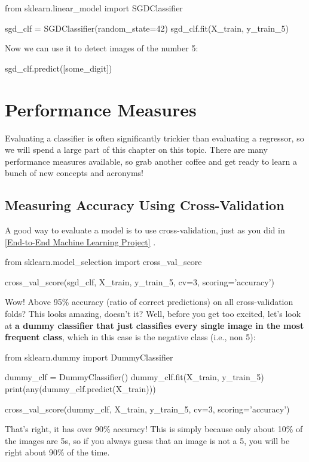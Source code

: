 \begin{pyc}
    from sklearn.linear_model import SGDClassifier

    sgd_clf = SGDClassifier(random_state=42)
    sgd_clf.fit(X_train, y_train_5)
\end{pyc}
Now we can use it to detect images of the number 5:
\begin{pyc}
    sgd_clf.predict([some_digit])
\end{pyc}
\section{Performance Measures}
Evaluating a classifier is often significantly trickier than evaluating a regressor, so we will spend a large part of this chapter on this topic. There are many performance measures available, so grab another coffee and get ready to learn a bunch of new concepts and acronyms!
\subsection{Measuring Accuracy Using Cross-Validation}
A good way to evaluate a model is to use cross-validation, just as you did in \autoref{End-to-End Machine Learning Project} .
\begin{pyc}
    from sklearn.model_selection import cross_val_score

    cross_val_score(sgd_clf, X_train, y_train_5, cv=3, scoring='accuracy')
\end{pyc}

Wow! Above 95\% accuracy (ratio of correct predictions) on all cross-validation folds? This looks amazing, doesn't it? Well, before you get too excited, let's look at \textbf{a dummy classifier that just classifies every single image in the most frequent class}, which in this case is the negative class (i.e., non 5):

\begin{pyc}
    from sklearn.dummy import DummyClassifier

    dummy_clf = DummyClassifier()
    dummy_clf.fit(X_train, y_train_5)
    print(any(dummy_clf.predict(X_train)))

    cross_val_score(dummy_clf, X_train, y_train_5, cv=3, scoring='accuracy')
\end{pyc}

That's right, it has over 90\% accuracy! This is simply because only about 10\% of the images are 5s, so if you always guess that an image is not a 5, you will be right about 90\% of the time.

